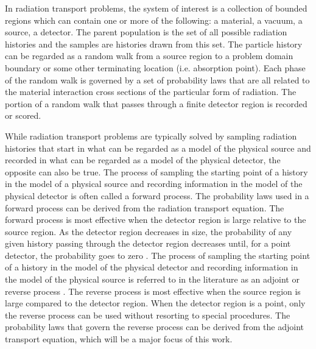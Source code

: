 \documentclass[letterpaper,12pt]{article}
\begin{document}
In radiation transport problems, the system of interest is a collection of 
bounded regions which can contain one or more of the following: a material, a 
vacuum, a source, a detector. The parent population is the set of all possible 
radiation histories and the samples are histories drawn from this set. The 
particle history can be regarded as a random walk from a source region to a 
problem domain boundary or some other terminating location (i.e. absorption 
point). Each phase of the random walk is governed by a set of probability laws 
that are all related to the material interaction cross sections of the 
particular form of radiation. The portion of a random walk that passes through 
a finite detector region is recorded or scored. 

While radiation transport problems are typically solved by sampling radiation
histories that start in what can be regarded as a model of the physical source
and recorded in what can be regarded as a model of the physical detector, the
opposite can also be true. The process of sampling the starting point of a 
history in the model of a physical source and recording information
in the model of the physical detector is often called
a forward process. The probability laws used in a forward process can be 
derived from the radiation transport equation. The forward process is most 
effective when the detector region is large relative to the source region. As 
the detector region decreases in size, the probability of any given history 
passing through the detector region decreases until, for a point detector, the 
probability goes to zero \cite{spanier_monte_1969}. The process of sampling the 
starting point of a history in the model of the physical detector and recording
information in the model of the physical source is referred to in the 
literature as an adjoint or reverse process 
\cite{spanier_monte_1969, desorgher_implementation_2010}. The reverse process
is most effective when the source region is large compared to the detector
region. When the detector region is a point, only the reverse process can be
used without resorting to special procedures. The probability laws that govern 
the reverse process can be derived from the adjoint transport equation, which 
will be a major focus of this work.
\end{document}
